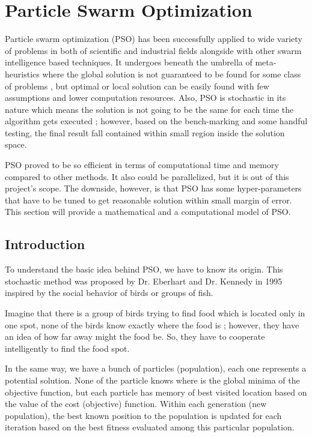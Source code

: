 
\large

\chapter*{Particle Swarm Optimization}
Particle swarm optimization (PSO) has been successfully
applied to wide variety of problems in both of scientific and industrial
fields alongside with other swarm intelligence based techniques. It
undergoes beneath the umbrella of meta-heuristics where the global
solution is not guaranteed to be found for some class of problems , but
optimal or local solution can be easily found with few assumptions and
lower computation resources. Also, PSO is stochastic in its nature which
means the solution is not going to be the same for each time the
algorithm gets executed ; however, based on the bench-marking and some
handful testing, the final result fall contained within small region
inside the solution space.

PSO proved to be so efficient in terms of computational time and memory
compared to other methods. It also could be parallelized, but it is out
of this project's scope. The downside, however, is that PSO has some
hyper-parameters that have to be tuned to get reasonable solution within
small margin of error. This section will provide a mathematical and a
computational model of PSO.


\section{Introduction}

To understand the basic idea behind PSO, we have to know its origin.
This stochastic method was proposed by Dr. Eberhart and Dr. Kennedy in
1995 inspired by the social behavior of birds or groups of fish.

Imagine that there is a group of birds trying to find food which is
located only in one spot, none of the birds know exactly where the food
is ; however, they have an idea of how far away might the food be. So,
they have to cooperate intelligently to find the food spot.

In the same way, we have a bunch of particles (population), each one
represents a potential solution. None of the particle knows where is the
global minima of the objective function, but each particle has memory of
best visited location based on the value of the cost (objective)
function. Within each generation (new population), the best known
position to the population is updated for each iteration based on the
best fitness evaluated among this particular population.

